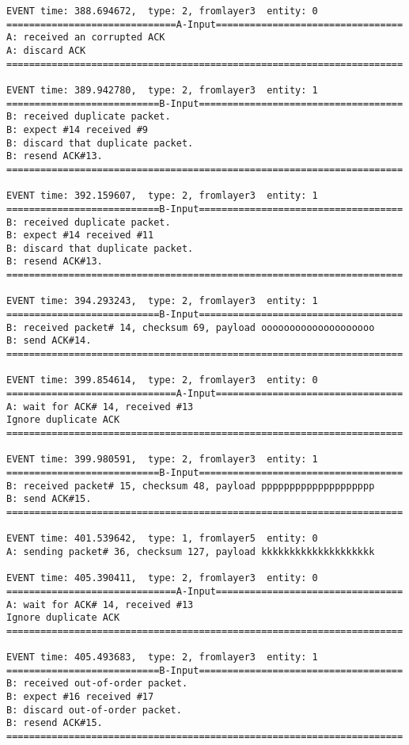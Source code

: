 \documentclass[12pt]{article}
\begin{document}
\begin{verbatim}
EVENT time: 388.694672,  type: 2, fromlayer3  entity: 0
==============================A-Input=================================
A: received an corrupted ACK 
A: discard ACK
======================================================================

EVENT time: 389.942780,  type: 2, fromlayer3  entity: 1
===========================B-Input====================================
B: received duplicate packet.
B: expect #14 received #9
B: discard that duplicate packet.
B: resend ACK#13.
======================================================================

EVENT time: 392.159607,  type: 2, fromlayer3  entity: 1
===========================B-Input====================================
B: received duplicate packet.
B: expect #14 received #11
B: discard that duplicate packet.
B: resend ACK#13.
======================================================================

EVENT time: 394.293243,  type: 2, fromlayer3  entity: 1
===========================B-Input====================================
B: received packet# 14, checksum 69, payload oooooooooooooooooooo
B: send ACK#14.
======================================================================

EVENT time: 399.854614,  type: 2, fromlayer3  entity: 0
==============================A-Input=================================
A: wait for ACK# 14, received #13
Ignore duplicate ACK
======================================================================

EVENT time: 399.980591,  type: 2, fromlayer3  entity: 1
===========================B-Input====================================
B: received packet# 15, checksum 48, payload pppppppppppppppppppp
B: send ACK#15.
======================================================================

EVENT time: 401.539642,  type: 1, fromlayer5  entity: 0
A: sending packet# 36, checksum 127, payload kkkkkkkkkkkkkkkkkkkk

EVENT time: 405.390411,  type: 2, fromlayer3  entity: 0
==============================A-Input=================================
A: wait for ACK# 14, received #13
Ignore duplicate ACK
======================================================================

EVENT time: 405.493683,  type: 2, fromlayer3  entity: 1
===========================B-Input====================================
B: received out-of-order packet.
B: expect #16 received #17
B: discard out-of-order packet.
B: resend ACK#15.
======================================================================


\end{verbatim}
\end{document}

